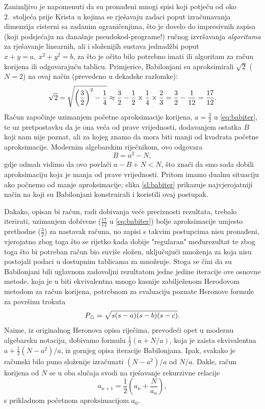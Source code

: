 \documentclass[12pt]{scrartcl}
\begin{document}
Zanimljivo je napomenuti da su pronađeni mnogi spisi koji potječu od oko 2.~stoljeća prije Krista u kojima
se rješavaju zadaci poput izračunavanja dimenzija cisterni sa zadanim ograničenjima, što je dovelo do impresivnih zapisa (koji podsjećaju
na današnje pseudokod-programe!) ručnog izvršavanja
 \emph{algoritama} za rješavanje linearnih, ali i složenijih sustava jednadžbi poput $x+y=a,\ x^2+y^2=b$, za što je očito bilo potrebno
imati ili algoritam za račun korijena ili odgovarajuću tablicu. Primjerice, Babilonjani su aproksimirali $\sqrt 2$ ($N=2$) na ovaj način (prevedeno
u dekadske razlomke)\cite{fowler1998}:
\begin{equation}\label{eq:babiter}
    \sqrt 2 = \sqrt{\left(\frac32\right)^2 - \frac14}\approx\frac32 - \frac12\times\frac14\times\frac23 = \frac32 - \frac{1}{12} = \frac{17}{12}\text.
\end{equation}
Račun započinje uzimanjem početne aproksimacije korijena, $a=\frac32$ u \eqref{eq:babiter}, te uz pretpostavku da je ona veća od prave vrijednosti,
dodavanjem ostatka $B$ koji nam nije poznat, ali za kojeg znamo da mora biti manji od kvadrata početne aproksimacije. Modernim algebarskim riječnikom,
ovo odgovara
\[
    B=a^2-N,
\]
gdje odmah vidimo da ovo povlači $a-B+N<N$, što znači da smo sada dobili aproksimaciju koja je manja od prave vrijednosti. Pritom imamo dualnu situaciju
ako počnemo od manje aproksimacije; slika \ref{sl:babiter} prikazuje najvjerojatniji način na koji su Babilonjani konstruirali i koristili ovaj postupak.

Dakako, opisan bi račun, radi dobivanja veće preciznosti rezultata, trebalo iterirati,
uzimanjem dobivene ($\frac{17}{12}$ u \eqref{eq:babiter}) bolje aproksimacije umjesto prethodne
($\frac32$) za nastavak računa, no zapisi s takvim postupcima nisu pronađeni,
vjerojatno zbog toga što se rijetko kada dobije "regularan" međurezultat te zbog toga što
bi potreban račun bio suviše složen, uključujući množenja za koja nisu postojali podaci u dostupnim tablicama za množenje. Stoga se čini da su 
Babilonjani bili uglavnom zadovoljni rezultatom jedne jedine iteracije ove osnovne metode, koja je u biti ekvivalentna mnogo kasnije zabilježenom Herodovom
metodom za račun korijena, potrebnom za evaluaciju poznate Heronove formule za površinu trokuta
\begin{equation*}
    P_{\triangle} = \sqrt{s(s-a)(s-b)(s-c)}\text.
\end{equation*}
Naime, iz originalnog Heronova opisa riječima, prevodeći opet u modernu algebarsku notaciju, dobivamo formulu $\frac12(a+N/a)$, koja je
zaista ekvivalentna $a+\frac12(N-a^2)/a$, iz gornjeg opisa iteracije Babilonjana. Ipak, svakako je računski bilo puno složenije izračunati
$(N-a^2)/a$ od $N/a$. %
Dakle, račun korijena od $N$ se u oba slučaja svodi na rješavanje rekurzivne relacije
\begin{equation}
    a_{n+1}=\frac12\left(a_n+\frac{N}{a_n}\right),
\end{equation}
s prikladnom početnom aproksimacijom $a_0$.
\end{document}
